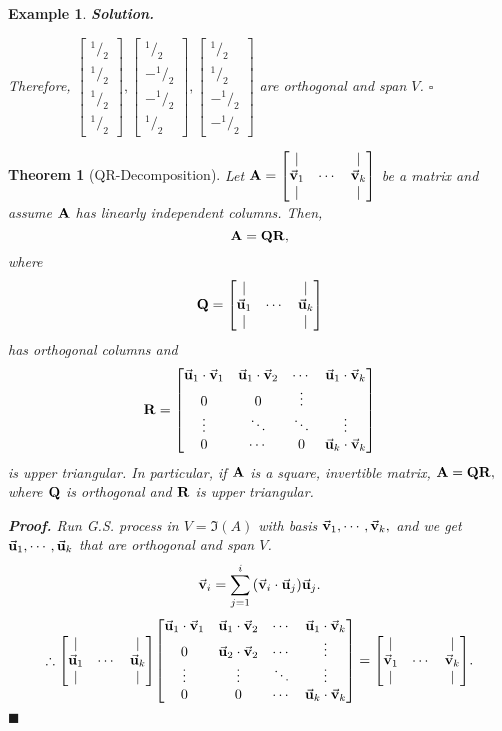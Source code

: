 \documentclass[12pt, a4paper]{article}
\newtheorem{thm}{Theorem}[subsection]
\newtheorem{eg}{Example}[subsection]
\newenvironment*{sol}{\par\indent\textbf{\textit{Solution. }}}{\hfill{$\square$}\par}
\newenvironment*{prf}{\par\indent\textbf{\textit{Proof. }}}{\hfill $\blacksquare$\par}
\def\vecv{\va{v}}
\def\vecu{\va{u}}
\def\matrixA{\vb{A}}
\begin{document}
\begin{eg}
\begin{sol}
\par Therefore, $\begin{bmatrix}^1/_2\\^1/_2\\^1/_2\\^1/_2\end{bmatrix}, \begin{bmatrix}^1/_2\\-^1/_2\\-^1/_2\\^1/_2\end{bmatrix}, \begin{bmatrix}^1/_2\\^1/_2\\-^1/_2\\-^1/_2\end{bmatrix}$ are orthogonal and span $V$.
	\end{sol}
\end{eg}
\begin{thm}[QR-Decomposition]
	Let $\matrixA=\mqty[{|&&|\\\vecv_1&\cdots&\vecv_k\\|&&|}]$ be a matrix and assume $\matrixA$ has linearly independent columns. Then, \[\matrixA=\vb Q\vb R,\] where \[\vb Q=\mqty[{|&&|\\\vecu_1&\cdots&\vecu_k\\|&&|}]\] has orthogonal columns and \[\vb R=\mqty[{\vecu_1\cdot\vecv_1&\vecu_1\cdot\vecv_2&\cdots&\vecu_1\cdot\vecv_k\\0&0&\vdots\\\vdots&\ddots&\ddots&\vdots\\0&\cdots&0&\vecu_k\cdot\vecv_k}]\]	is upper triangular. In particular, if $\matrixA$ is a square, invertible matrix, $\vb A=\vb Q\vb R,$ where $\vb Q$ is orthogonal and $\vb R$ is upper triangular. 
	\begin{prf}
		Run G.S. process in $V=\Im(A)$ with basis $\vecv_1,\cdots,\vecv_k,$ and we get $\vecu_1,\cdots,\vecu_k$ that are orthogonal and span $V$. \[\vecv_i=\sum_{j=1}^i\qty(\vecv_i\cdot\vecu_j)\vecu_j.\]\[\therefore\mqty[{|&&|\\\vecu_1&\cdots&\vecu_k\\|&&|}]\mqty[{\vecu_1\cdot\vecv_1&\vecu_1\cdot\vecv_2&\cdots&\vecu_1\cdot\vecv_k\\0&\vecu_2\cdot\vecv_2&\cdots&\vdots\\\vdots&\vdots&\ddots&\vdots\\0&0&\cdots&\vecu_k\cdot\vecv_k}]=\mqty[{|&&|\\\vecv_1&\cdots&\vecv_k\\|&&|}].\]
	\end{prf}
\end{thm}
\end{document}
